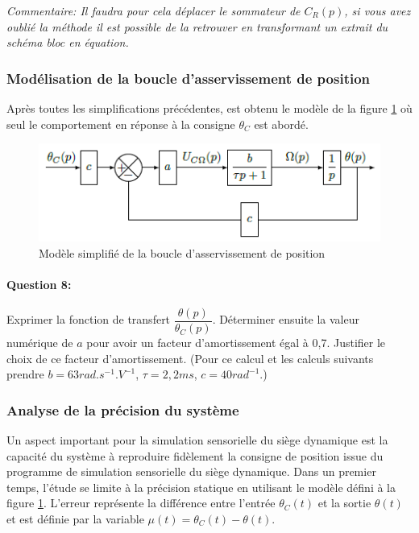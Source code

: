 \textit{Commentaire: Il faudra pour cela déplacer le sommateur de $C_R(p)$, si vous avez oublié la méthode il est possible de la retrouver en transformant un extrait du schéma bloc en équation.}

\subsubsection{Modélisation de la boucle d'asservissement de position}

Après toutes les simplifications précédentes, est obtenu le modèle de la figure \ref{fig14} où seul le comportement en réponse à la consigne $\theta_C$ est abordé.

\begin{figure}[!ht]
\begin{center}
 \includegraphics[width=0.7\linewidth]{img/img15}
\end{center}
\caption{Modèle simplifié de la boucle d'asservissement de position}
\label{fig14}
\end{figure}

\paragraph{Question 8:} Exprimer la fonction de transfert $\dfrac{\theta(p)}{\theta_C(p)}$. Déterminer ensuite la valeur numérique de $a$ pour avoir un facteur d'amortissement égal à 0,7. Justifier le choix de ce facteur d'amortissement. (Pour ce calcul et les calculs suivants prendre $b=63rad.s^{-1}.V^{-1}$, $\tau=2,2ms$, $c=40rad^{-1}$.)

\subsubsection{Analyse de la précision du système}

Un aspect important pour la simulation sensorielle du siège dynamique est la capacité du système à reproduire fidèlement la consigne de position issue du programme de simulation sensorielle du siège dynamique. Dans un premier temps, l'étude se limite à la précision statique en utilisant le modèle défini à la figure \ref{fig14}. L'erreur représente la différence entre l'entrée $\theta_C(t)$ et la sortie $\theta(t)$ et est définie par la variable $\mu(t)=\theta_C(t)-\theta(t)$.


